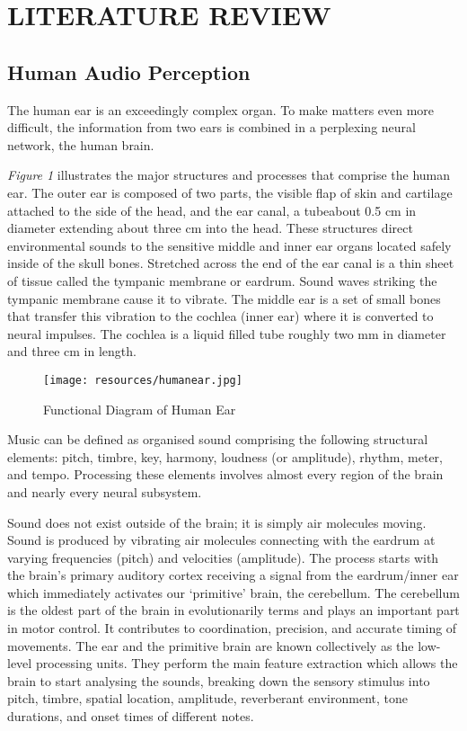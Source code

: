 \newpage
\section{LITERATURE REVIEW}

\subsection{Human Audio Perception}

The human ear is an exceedingly complex organ.  To make matters even more difficult, the information from two ears is combined in a perplexing neural network,
the human brain. \cite{smith2013}

\textit{Figure 1} illustrates the major structures and processes that comprise the human ear. The outer ear is composed of two parts, the visible flap of skin and
cartilage attached to the side of the head, and the ear canal, a tubeabout 0.5 cm in diameter extending about three cm into the head. These structures direct environmental
sounds to the sensitive middle and inner ear organs located safely inside of the skull bones. Stretched across the end of the ear canal is a thin sheet of tissue called the
tympanic membrane or eardrum. Sound waves striking the tympanic membrane cause it to vibrate. The middle ear is a set of small bones that transfer this vibration to the cochlea
(inner ear) where it is converted to neural impulses. The cochlea is a liquid filled tube roughly two mm in diameter and three cm in length.
\begin{figure}[h]
        \centering
        \texttt{[image: resources/humanear.jpg]}
        \caption{Functional Diagram of Human Ear}
        \label{fig:figure1}
\end{figure}

Music can be defined as organised sound comprising the following structural elements: pitch, timbre, key, harmony, loudness (or amplitude), rhythm, meter, and tempo. Processing
these elements involves almost every region of the brain and nearly every neural subsystem.

Sound does not exist outside of the brain; it is simply air molecules moving. Sound is produced by vibrating air molecules connecting with the
eardrum at varying frequencies (pitch) and velocities (amplitude). The process starts with the brain’s primary auditory cortex receiving a signal from the eardrum/inner ear
which immediately activates our ‘primitive’ brain, the cerebellum. The cerebellum is the oldest part of the brain in evolutionarily terms and plays an important part in motor control.
It contributes to coordination, precision, and accurate timing of movements. The ear and the primitive brain are known collectively as the low-level processing units. They perform the
main feature extraction which allows the brain to start analysing the sounds, breaking down the sensory stimulus into pitch, timbre, spatial location, amplitude, reverberant environment,
tone durations, and onset times of different notes. 

